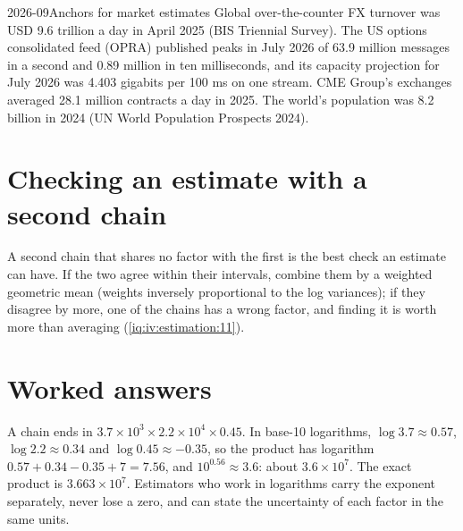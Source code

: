 \begin{dated}{2026-09}{Anchors for market estimates}\label{dat:iv:estimation:anchors}
Global over-the-counter FX turnover was USD 9.6 trillion a day in April 2025 (BIS Triennial Survey). The US
options consolidated feed (OPRA) published peaks in July 2026 of 63.9 million messages in a second and 0.89
million in ten milliseconds, and its capacity projection for July 2026 was 4.403 gigabits per 100 ms on one
stream. CME Group's exchanges averaged 28.1 million contracts a day in 2025. The world's population was 8.2
billion in 2024 (UN World Population Prospects 2024).
\end{dated}

\section{Checking an estimate with a second chain}

A second chain that shares no factor with the first is the best check an estimate can have. If the two agree
within their intervals, combine them by a weighted geometric mean (weights inversely proportional to the log
variances); if they disagree by more, one of the chains has a wrong factor, and finding it is worth more than
averaging (\cref{iq:iv:estimation:11}).

\section{Worked answers}

\begin{example}\label{ex:iv:estimation:logs}
A chain ends in $3.7 \times 10^3 \times 2.2 \times 10^4 \times 0.45$. In base-10 logarithms, $\log 3.7 \approx 0.57$,
$\log 2.2 \approx 0.34$ and $\log 0.45 \approx -0.35$, so the product has logarithm $0.57 + 0.34 - 0.35 + 7 = 7.56$, and
$10^{0.56} \approx 3.6$: about $3.6 \times 10^7$. The exact product is $3.663 \times 10^7$. Estimators who work in
logarithms carry the exponent separately, never lose a zero, and can state the uncertainty of each factor in the same
units.
\end{example}

